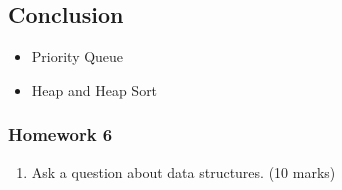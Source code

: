\documentclass[aspectratio=169, 14pt]{beamer}
\begin{document}
\begin{frame}

    \section{\textcolor{darkmidnightblue}{Conclusion}}
    \begin{itemize}
        \item Priority Queue
        \item Heap and Heap Sort
    \end{itemize}
\end{frame}


\begin{frame}
    \frametitle{Homework 6}
\begin{enumerate}
    \item Ask a question about data structures. (10 marks)
\end{enumerate}
\end{frame}
\end{document}

